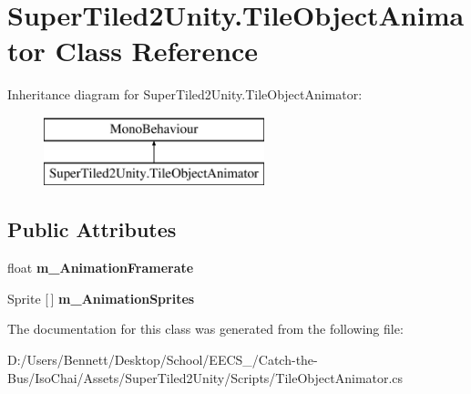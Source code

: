 \hypertarget{class_super_tiled2_unity_1_1_tile_object_animator}{}\section{Super\+Tiled2\+Unity.\+Tile\+Object\+Animator Class Reference}
\label{class_super_tiled2_unity_1_1_tile_object_animator}
Inheritance diagram for Super\+Tiled2\+Unity.\+Tile\+Object\+Animator\+:\begin{figure}[H]
\begin{center}
\leavevmode
\includegraphics[height=2.000000cm]{class_super_tiled2_unity_1_1_tile_object_animator}
\end{center}
\end{figure}
\subsection*{Public Attributes}
\begin{DoxyCompactItemize}
\item 
\mbox{\label{class_super_tiled2_unity_1_1_tile_object_animator_ab7b1933dc45ca4111835ff96972beb4b}} 
float {\bfseries m\+\_\+\+Animation\+Framerate}
\item 
\mbox{\label{class_super_tiled2_unity_1_1_tile_object_animator_a6d1a9d1a7939dc7cbc3bc7dfa1e3251d}} 
Sprite \mbox{[}$\,$\mbox{]} {\bfseries m\+\_\+\+Animation\+Sprites}
\end{DoxyCompactItemize}


The documentation for this class was generated from the following file\+:\begin{DoxyCompactItemize}
\item 
D\+:/\+Users/\+Bennett/\+Desktop/\+School/\+E\+E\+C\+S\+\_/\+Catch-\/the-\/\+Bus/\+Iso\+Chai/\+Assets/\+Super\+Tiled2\+Unity/\+Scripts/Tile\+Object\+Animator.\+cs\end{DoxyCompactItemize}
